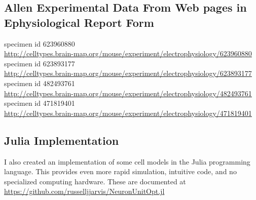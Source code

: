 

\subsection{Allen Experimental Data From Web pages in Ephysiological Report Form}

\label{sec:allen_report_data}
specimen id 623960880 \\
{\small  
\url{http://celltypes.brain-map.org/mouse/experiment/electrophysiology/623960880}
specimen id 623893177 \\
\url{http://celltypes.brain-map.org/mouse/experiment/electrophysiology/623893177}
specimen id 482493761 \\
\url{http://celltypes.brain-map.org/mouse/experiment/electrophysiology/482493761}
specimen id 471819401 \\
\url{http://celltypes.brain-map.org/mouse/experiment/electrophysiology/471819401}
}

\subsection{Julia Implementation}
I also created an implementation of some cell models in the Julia programming language.
This provides even more rapid simulation, intuitive code, and no specialized computing hardware.
These are documented at
\url{https://github.com/russelljjarvis/NeuronUnitOpt.jl}


